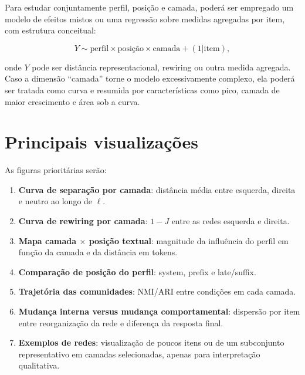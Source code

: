\documentclass[11pt,a4paper]{article}
\begin{document}
Para estudar conjuntamente perfil, posição e camada, poderá ser empregado um modelo de efeitos mistos ou uma regressão sobre medidas agregadas por item, com estrutura conceitual:

\[
Y
\sim
\text{perfil}
\times
\text{posição}
\times
\text{camada}
+
(1|\text{item}),
\]

onde $Y$ pode ser distância representacional, rewiring ou outra medida agregada. Caso a dimensão ``camada'' torne o modelo excessivamente complexo, ela poderá ser tratada como curva e resumida por características como pico, camada de maior crescimento e área sob a curva.

\section{Principais visualizações}

As figuras prioritárias serão:

\begin{enumerate}
    \item \textbf{Curva de separação por camada}: distância média entre esquerda, direita e neutro ao longo de $\ell$.

    \item \textbf{Curva de rewiring por camada}: $1-J$ entre as redes esquerda e direita.

    \item \textbf{Mapa camada $\times$ posição textual}: magnitude da influência do perfil em função da camada e da distância em tokens.

    \item \textbf{Comparação de posição do perfil}: system, prefix e late/suffix.

    \item \textbf{Trajetória das comunidades}: NMI/ARI entre condições em cada camada.

    \item \textbf{Mudança interna versus mudança comportamental}: dispersão por item entre reorganização da rede e diferença da resposta final.

    \item \textbf{Exemplos de redes}: visualização de poucos itens ou de um subconjunto representativo em camadas selecionadas, apenas para interpretação qualitativa.
\end{enumerate}
\end{document}
